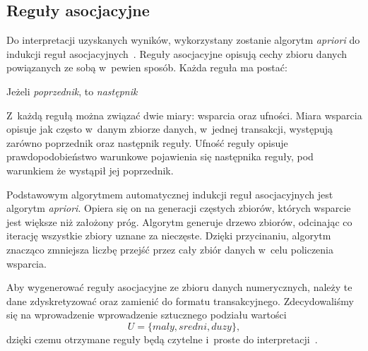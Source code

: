\subsection{Reguły asocjacyjne}

Do interpretacji uzyskanych wyników, wykorzystany zostanie algorytm \emph{apriori} do indukcji reguł asocjacyjnych~\cite{agrawal1996fast}. Reguły asocjacyjne opisują cechy zbioru danych powiązanych ze sobą w~pewien sposób. Każda reguła ma postać:

\begin{center}
    Jeżeli \emph{poprzednik}, to \emph{następnik} 
\end{center}

Z~każdą regułą można związać dwie miary: wsparcia oraz ufności. Miara wsparcia opisuje jak często w~danym zbiorze danych, w~jednej transakcji, występują zarówno poprzednik oraz następnik reguły. Ufność reguły opisuje prawdopodobieństwo warunkowe pojawienia się następnika reguły, pod warunkiem że wystąpił jej poprzednik.

Podstawowym algorytmem automatycznej indukcji reguł asocjacyjnych jest algorytm \emph{apriori}. Opiera się on na generacji częstych zbiorów, których wsparcie jest większe niż założony próg. Algorytm generuje drzewo zbiorów, odcinając co iterację wszystkie zbiory uznane za nieczęste. Dzięki przycinaniu, algorytm znacząco zmniejsza liczbę przejść przez cały zbiór danych w~celu policzenia wsparcia.

Aby wygenerować reguły asocjacyjne ze zbioru danych numerycznych, należy te dane zdyskretyzować oraz zamienić do formatu transakcyjnego. Zdecydowaliśmy się na wprowadzenie wprowadzenie sztucznego podziału wartości $$U = \{maly, sredni, duzy\},$$
dzięki czemu otrzymane reguły będą czytelne i~proste do interpretacji~\cite{agrawal1996fast}.